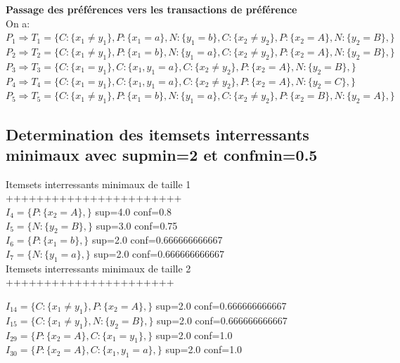 \documentclass[a4paper,12pt,openany,oneside]{article}
\begin{document}
        \textbf{Passage des préférences vers les transactions de préférence}\\
        On a:\\
   
        
        \noindent $P_{1}\Rightarrow T_{1}=\{C:\{x_{1}\neq y_{1}\},P:\{x_{1}=a\},N:\{y_{1}=b\},C:\{x_{2}\neq y_{2}\},P:\{x_{2}=A\},N:\{y_{2}=B\},\}$ \\
        
        \noindent $P_{2}\Rightarrow T_{2}=\{C:\{x_{1}\neq y_{1}\},P:\{x_{1}=b\},N:\{y_{1}=a\},C:\{x_{2}\neq y_{2}\},P:\{x_{2}=A\},N:\{y_{2}=B\},\}$ \\
        
        \noindent $P_{3}\Rightarrow T_{3}=\{C:\{x_{1}=y_{1}\},C:\{x_{1},y_{1}=a\},C:\{x_{2}\neq y_{2}\},P:\{x_{2}=A\},N:\{y_{2}=B\},\}$ \\
        
        \noindent $P_{4}\Rightarrow T_{4}=\{C:\{x_{1}=y_{1}\},C:\{x_{1},y_{1}=a\},C:\{x_{2}\neq y_{2}\},P:\{x_{2}=A\},N:\{y_{2}=C\},\}$ \\
        
        \noindent $P_{5}\Rightarrow T_{5}=\{C:\{x_{1}\neq y_{1}\},P:\{x_{1}=b\},N:\{y_{1}=a\},C:\{x_{2}\neq y_{2}\},P:\{x_{2}=B\},N:\{y_{2}=A\},\}$ \\
        
        
        
        \subsection{Determination des itemsets interressants minimaux avec supmin=2 et confmin=0.5}
        
        Itemsets interressants minimaux de taille 1 +++++++++++++++++++++++\\
        
        $I_{4}=\{P:\{x_{2}=A\},\}$  sup=4.0 conf=0.8\\
        $I_{5}=\{N:\{y_{2}=B\},\}$  sup=3.0 conf=0.75\\
        $I_{6}=\{P:\{x_{1}=b\},\}$  sup=2.0 conf=0.666666666667\\
        $I_{7}=\{N:\{y_{1}=a\},\}$  sup=2.0 conf=0.666666666667\\
        
        Itemsets interressants minimaux de taille 2 ++++++++++++++++++++++\
        
        $I_{14}=\{C:\{x_{1}\neq y_{1}\},P:\{x_{2}=A\},\}$  sup=2.0 conf=0.666666666667\\
        $I_{15}=\{C:\{x_{1}\neq y_{1}\},N:\{y_{2}=B\},\}$  sup=2.0 conf=0.666666666667\\
        $I_{29}=\{P:\{x_{2}=A\},C:\{x_{1}=y_{1}\},\}$  sup=2.0 conf=1.0\\
        $I_{30}=\{P:\{x_{2}=A\},C:\{x_{1},y_{1}=a\},\}$  sup=2.0 conf=1.0\\
        
\end{document}
